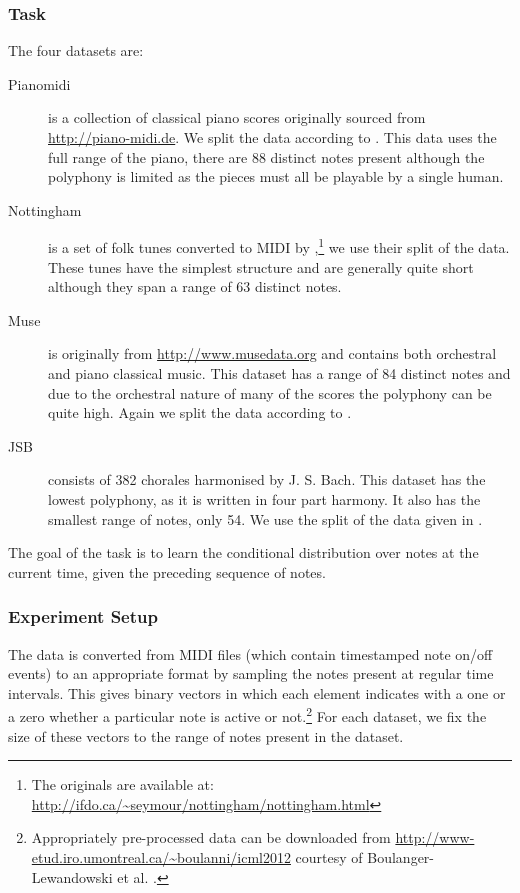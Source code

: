 \subsubsection{Task}
The four datasets are:
\begin{description}
\item[Pianomidi] {
	is a collection of classical piano scores originally sourced from
	\url{http://piano-midi.de}. We split the data according to
	\autocite{Poliner2007}. This data uses the full range of the piano,
	there are 88 distinct notes present although the polyphony is limited
	as the pieces must all be playable by a single human.}
\item[Nottingham] {
	is a set of folk tunes converted to MIDI by 
	\autocite{Boulanger-Lewandowski2012},\footnote{
	The originals are available at: \url{http://ifdo.ca/~seymour/nottingham/nottingham.html}}
	we use their split of the data. These tunes have the simplest structure and are
	generally quite short although they span a range of 63 distinct notes.}
\item[Muse] {
	is originally from \url{http://www.musedata.org} and contains both orchestral and
	piano classical music. This dataset has a range of 84 distinct notes and due to the
	orchestral nature of many of the scores the polyphony can be quite high. Again we
	split the data according to \autocite{Boulanger-Lewandowski2012}.}
\item[JSB] {
	consists of 382 chorales harmonised by J. S. Bach. This dataset has the
	lowest polyphony, as it is written in four part harmony.
	It also has the smallest range of notes, only 54.
	We use the split of the data given in \autocite{Allan2004}.}
\end{description} The goal of the task is to learn the conditional
distribution over notes at the current time, given the preceding sequence of notes.


\subsubsection{Experiment Setup}
The data is converted from MIDI files (which contain timestamped note on/off events) to
an appropriate format by sampling the notes present at regular time intervals.
This gives binary vectors in which each element indicates with a one or a zero whether
a particular note is active or not.\footnote{Appropriately pre-processed data can
be downloaded from \url{http://www-etud.iro.umontreal.ca/~boulanni/icml2012}
courtesy of Boulanger-Lewandowski et al. \autocite{Boulanger-Lewandowski2012}.}
For each dataset, we fix the size of these vectors to the range of notes present in the
dataset.

